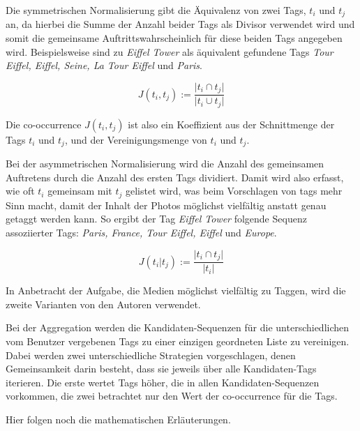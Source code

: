 Die symmetrischen Normalisierung gibt die Äquivalenz von zwei Tags, ${t_i}$ und ${t_j}$ an, da hierbei die Summe der Anzahl beider Tags als Divisor verwendet wird und somit die gemeinsame Auftrittswahrscheinlich für diese beiden Tags angegeben wird. Beispielsweise sind zu \emph{Eiffel Tower} als äquivalent gefundene Tags \emph{Tour Eiffel, Eiffel, Seine, La Tour Eiffel} und \emph{Paris}.
\begin{figure}[hptb]
  \begin{equation}
  \label{symmetricNormalization}
   J(t_i, t_j) := \frac{\vert t_i \cap t_j \vert}{ \vert t_i \cup t_j \vert }
  \end{equation}
\end{figure}

Die co-occurrence $J(t_i, t_j)$ ist also ein Koeffizient aus der Schnittmenge der Tags ${t_i}$ und ${t_j}$, und der Vereinigungsmenge von ${t_i}$ und ${t_j}$.

Bei der asymmetrischen Normalisierung wird die Anzahl des gemeinsamen Auftretens durch die Anzahl des ersten Tags dividiert. Damit wird also erfasst, wie oft ${t_i}$ gemeinsam mit ${t_j}$ gelistet wird, was beim Vorschlagen von tags mehr Sinn macht, damit der Inhalt der Photos möglichst vielfältig anstatt genau getaggt werden kann. So ergibt der Tag \emph{Eiffel Tower} folgende Sequenz assoziierter Tags: \emph{Paris, France, Tour Eiffel, Eiffel} und \emph{Europe}.
\begin{figure}[hptb]
 \begin{equation}
 \label{asymmetricNormalization}
  J(t_i \vert t_j) := \frac{\vert t_i \cap t_j \vert}{ \vert t_i \vert }
 \end{equation}
\end{figure}

In Anbetracht der Aufgabe, die Medien möglichst vielfältig zu Taggen, wird die zweite Varianten von den Autoren verwendet.

Bei der Aggregation werden die Kandidaten-Sequenzen für die unterschiedlichen vom Benutzer vergebenen Tags zu einer einzigen geordneten Liste zu vereinigen. Dabei werden zwei unterschiedliche Strategien vorgeschlagen, denen Gemeinsamkeit darin besteht, dass sie jeweils über alle Kandidaten-Tags iterieren. Die erste wertet Tags höher, die in allen Kandidaten-Sequenzen vorkommen, die zwei betrachtet nur den Wert der co-occurrence für die Tags.

Hier folgen noch die mathematischen Erläuterungen.

